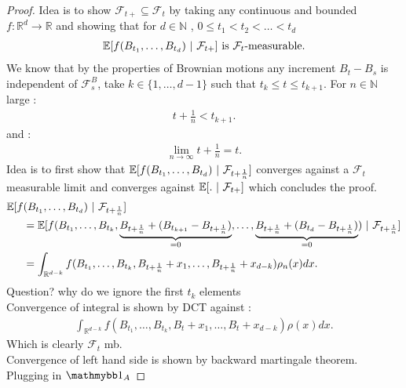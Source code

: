 \begin{proof}
  Idea is to show $\mathcal{F}_{t+} \subseteq \mathcal{F}_t$ by taking any continuous and bounded $f : \mathbb{R}^{d} \to  \mathbb{R} $ and showing that for $d \in  \mathbb{N}$ , $0 \le t_1<t_2<\ldots <t_d$
  \begin{align*}
    \mathbb{E}[f(B_{t_1},\ldots ,B_{t_d}) \ | \ \mathcal{F}_{t+}] \text{ is } \mathcal{F}_t \text{-measurable}
  .\end{align*}
  We know that by the properties of Brownian motions any increment $B_t - B_s $ is independent of $\mathcal{F}_s^{B} $,
  take $k \in  \{1,\ldots ,d-1\}  $ such that $t_k \le t \le t_{k+1}$. For $n \in \mathbb{N}$ large : 
  \begin{align*}
    t + \frac{1}{n} < t_{k+1}
  .\end{align*}
  and : 
  \begin{align*}
    \lim_{n \to \infty}  t+\frac{1}{n} = t
  .\end{align*}
  Idea is to first show that  $\E[f(B_{t_{1}},\ldots ,B_{t_d})\ | \ \mathcal{F}_{t+\frac{1}{n}}]$ converges against a $\mathcal{F}_t$ measurable limit 
  and converges against $\E[. \ | \ \mathcal{F}_{t+}]$ which concludes the proof. \\[1ex]
  \begin{align*}
    \E[f&(B_{t_{1}},\ldots ,B_{t_d})\ | \ \mathcal{F}_{t+\frac{1}{n}}] \\
    &=  \E[f(B_{t_{1}},\ldots,B_{t_k},\underbrace{B_{t+\frac{1}{n}}+ (B_{t_{k+1}} - B_{t+\frac{1}{n}})}_{=0},\ldots  ,\underbrace{B_{t+\frac{1}{n}}+ (B_{t_{d}} - B_{t+\frac{1}{n}})}_{=0})\ | \ \mathcal{F}_{t+\frac{1}{n}}]\\
    &= \int_{\mathbb{R}^{d-k} } f(B_{t_{1}},\ldots,B_{t_k},B_{t+\frac{1}{n}}+ x_1,\ldots  ,B_{t+\frac{1}{n}}+ x_{d-k}) \rho_n(x) dx
  .\end{align*}
  Question? why do we ignore the first $t_k$ elements \\ 
  Convergence of integral is shown by DCT against : 
  \begin{align*}
    \int_{\mathbb{R}^{d-k} } f(B_{t_{1}},\ldots,B_{t_k},B_{t}+ x_1,\ldots  ,B_{t}+ x_{d-k}) \rho(x) dx
  .\end{align*}
  Which is clearly $\mathcal{F}_t$ mb. \\
  Convergence of left hand side is shown by backward martingale theorem. \\[1ex]
  Plugging in $\cha_{A}$
\end{proof}


